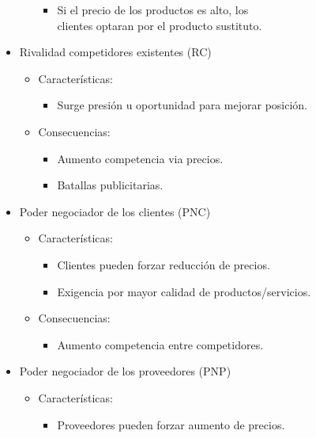 \documentclass{templateNote}
\begin{document}
\begin{itemize}
\begin{itemize}
            \begin{itemize}
                \item Si el precio de los productos es alto, los \\clientes optaran por el producto sustituto.
            \end{itemize}
        \end{itemize}
        \item Rivalidad competidores existentes (RC)
        \begin{itemize}
            \item Características:
            \begin{itemize}
                \item Surge presión u oportunidad para mejorar posición.
            \end{itemize}
            \item Consecuencias:
            \begin{itemize}
                \item Aumento competencia via precios.
                \item Batallas publicitarias.
            \end{itemize}
        \end{itemize}
        \item Poder negociador de los clientes (PNC)
        \begin{itemize}
            \item Características:
            \begin{itemize}
                \item Clientes pueden forzar reducción de precios.
                \item Exigencia por mayor calidad de productos/servicios.
            \end{itemize}
            \item Consecuencias:
            \begin{itemize}
                \item Aumento competencia entre competidores.
            \end{itemize}
        \end{itemize}
        \item Poder negociador de los proveedores (PNP)
        \begin{itemize}
            \item Características:
            \begin{itemize}
                \item Proveedores pueden forzar aumento de precios.

\end{itemize}
\end{itemize}
\end{itemize}
\end{document}
